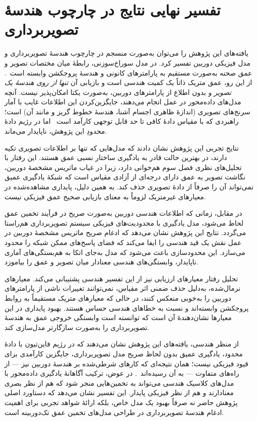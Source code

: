 \section{تفسیر نهایی نتایج در چارچوب هندسهٔ تصویربرداری}
\label{sec:chapter5_geometric_interpretation}

یافته‌های این پژوهش را می‌توان به‌صورت منسجم
در چارچوب هندسهٔ تصویربرداری و مدل فیزیکی دوربین تفسیر کرد.
در مدل سوراخ‌سوزنی، رابطهٔ میان مختصات تصویر و عمق صحنه
به‌صورت مستقیم به پارامترهای کانونی و هندسهٔ پروجکشن وابسته
است~\cite{HartleyZisserman2004}.
از این رو، عمق متریک ذاتاً یک کمیت هندسی است
و بازیابی آن \emph{تنها از روی هندسهٔ یک تصویر} و بدون اطلاع از پارامترهای
دوربین، به‌صورت یکتا امکان‌پذیر نیست. آنچه مدل‌های داده‌محور در عمل انجام
می‌دهند، جایگزین‌کردن این اطلاعات غایب با آمار سرنخ‌های تصویری (اندازهٔ ظاهری
اجسام آشنا، هندسهٔ خطوط گریز و مانند آن) است؛ راهبردی که با مقیاس دادهٔ کافی
تا حد قابل توجهی کارآمد است~\cite{Bochkovskii2025DepthPro} اما در رژیم
دادهٔ محدودِ این پژوهش، ناپایدار می‌ماند.

نتایج تجربی این پژوهش نشان دادند که
مدل‌هایی که تنها بر اطلاعات تصویری تکیه دارند،
در بهترین حالت قادر به یادگیری ساختار نسبی عمق هستند.
این رفتار با تحلیل‌های نظری فصل سوم هم‌خوانی دارد،
زیرا در غیاب ماتریس مشخصهٔ دوربین،
نگاشت تصویر به عمق دارای درجه‌ای از آزادی مقیاس است
که شبکهٔ یادگیری عمیق نمی‌تواند آن را
صرفاً از دادهٔ تصویری حذف کند.
به همین دلیل،
پایداری مشاهده‌شده در معیارهای غیرمتریک
لزوماً به معنای بازیابی صحیح عمق فیزیکی نیست.

در مقابل،
زمانی که اطلاعات هندسی دوربین
به‌صورت صریح در فرآیند تخمین عمق لحاظ می‌شود،
مدل یادگیری با محدودیت‌های فیزیکی سیستم تصویربرداری
هم‌راستا می‌گردد.
نتایج این پژوهش نشان می‌دهد که
ادغام صریح ماتریس مشخصهٔ دوربین
در عمل نقش یک قید هندسی را ایفا می‌کند
که فضای پاسخ‌های ممکن شبکه را محدود می‌سازد.
این محدودسازی باعث می‌شود که
مدل به‌جای اتکا به هم‌بستگی‌های آماری ناپایدار،
وابستگی‌های هندسی معنادار میان تصویر و عمق را بیاموزد.

تحلیل رفتار معیارهای ارزیابی نیز
از این تفسیر هندسی پشتیبانی می‌کند.
معیارهای نرمال‌شده، به‌دلیل حذف ضمنی اثر مقیاس،
نمی‌توانند تغییرات ناشی از پارامترهای دوربین را به‌خوبی منعکس کنند،
در حالی که معیارهای متریک
مستقیماً به روابط پروجکشن وابسته‌اند
و نسبت به خطاهای هندسی حساس هستند.
بهبود پایداری در این معیارها
نشان‌دهندهٔ آن است که
\proposedmodel{} توانسته است
وابستگی خروجی عمق به هندسهٔ تصویربرداری را
به‌صورت سازگارتر مدل‌سازی کند.

از منظر هندسی،
یافته‌های این پژوهش نشان می‌دهند که
در رژیم فاین‌تیون با دادهٔ محدود، یادگیری عمیق بدون لحاظ صریح مدل
تصویربرداری، جایگزین کارآمدی برای قیود فیزیکی نیست؛ همان نتیجه‌ای که کارهای
شرطی‌شده بر هندسهٔ دوربین نیز --- از راه‌های متفاوت --- به آن
رسیده‌اند~\cite{Facil2019CAMConvs,Yin2023Metric3D,Piccinelli2024UniDepth}.
در عوض،
ترکیب آگاهانهٔ یادگیری داده‌محور
با مدل‌های کلاسیک هندسی
می‌تواند به تخمین‌هایی منجر شود
که هم از نظر بصری معنادارند
و هم از نظر فیزیکی پایدار.
این تفسیر نشان می‌دهد که
دستاورد اصلی پژوهش حاضر
نه صرفاً بهبود یک مدل خاص،
بلکه ارائهٔ شواهد تجربی
برای اهمیت ادغام هندسهٔ تصویربرداری
در طراحی مدل‌های تخمین عمق تک‌دوربینه است.


